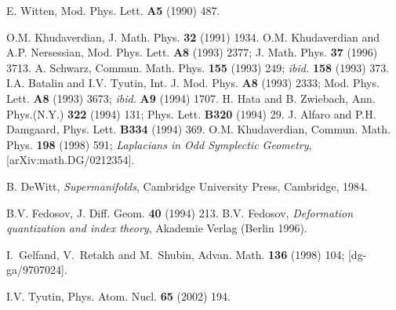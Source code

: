 \documentclass[a4paper,11pt]{article}
\begin{document}
\begin{thebibliography}{99}
  E. Witten, Mod. Phys. Lett. \textbf{A5} (1990) 487.

  O.M. Khudaverdian, J. Math. Phys. \textbf{32} (1991) 1934.
\newline
O.M. Khudaverdian and A.P. Nersessian, Mod. Phys. Lett. \textbf{A8}
 (1993) 2377; J. Math. Phys. \textbf{37} (1996) 3713. \newline
A. Schwarz, Commun. Math. Phys. \textbf{155} (1993) 249; \textit{%
ibid.} \textbf{158} (1993) 373. \newline
I.A. Batalin and I.V. Tyutin, Int. J. Mod. Phys. \textbf{A8} (1993) 2333;
Mod. Phys. Lett. \textbf{A8} (1993) 3673; \textit{ibid.}
\textbf{A9} (1994) 1707. \newline
H. Hata and B. Zwiebach, Ann. Phys.(N.Y.) \textbf{322} (1994) 131;
Phys. Lett. \textbf{B320} (1994) 29.
\newline
J. Alfaro and P.H. Damgaard, Phys. Lett. \textbf{B334} (1994) 369.%
\newline
O.M. Khudaverdian, Commun. Math. Phys. \textbf{198} (1998) 591;
\textit{Laplacians in Odd Symplectic Geometry}, [arXiv:math.DG/0212354].

  B. DeWitt, \textit{Supermanifolds}, Cambridge University
Press, Cambridge, 1984.

  B.V. Fedosov, J. Diff. Geom. \textbf{40} (1994) 213.%
\newline
B.V. Fedosov, \textit{Deformation quantization and index theory}, Akademie
Verlag (Berlin 1996).

  I.~Gelfand, V.~Retakh and M.~Shubin, Advan. Math.
\textbf{136} (1998) 104; [dg-ga/9707024].

  I.V. Tyutin, Phys. Atom. Nucl. \textbf{65} (2002) 194.

\end{thebibliography}
\end{document}
